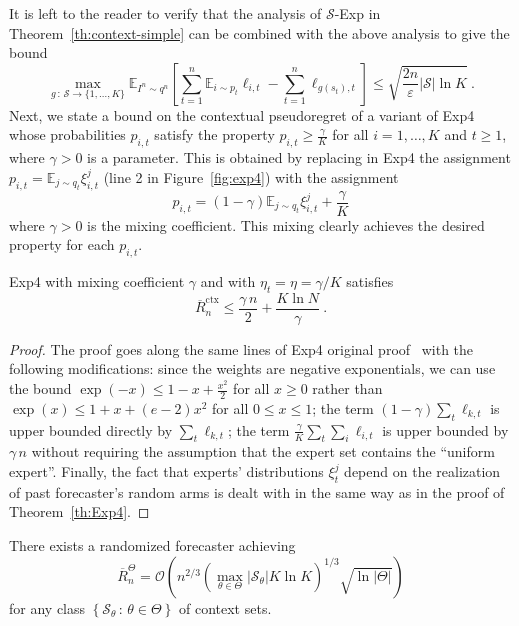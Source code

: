 \documentclass[11pt]{hackednow}
\newcommand{\E}{\mathbb{E}}
\newcommand{\cS}{\mathcal{S}}
\newcommand{\oR}{\overline{R}}
\newcommand{\theset}[2]{\left\{{#1}\,:\,{#2}\right\}}
\newcommand{\ve}{\varepsilon}
\newcommand{\oRx}{\oR^{\mathrm{ctx}}}
\begin{document}
It is left to the reader to verify that the analysis of $\cS$-Exp in Theorem~\ref{th:context-simple} can be combined with the above analysis to give the bound
\begin{equation}
\label{eq:exp3-rebel-cont}
    \max_{g \,:\, \cS\to\{1,\dots,K\}} \E_{I^n \sim q^n} \left[ \sum_{t=1}^n \E_{i \sim p_t} \ell_{i,t} - \sum_{t=1}^n \ell_{g(s_t),t} \right] \le
    \sqrt{\frac{2 n}{\ve}|\cS|\ln K}~.
\end{equation}
Next, we state a bound on the contextual pseudoregret of a variant of Exp4 whose probabilities $p_{i,t}$ satisfy the property $p_{i,t} \ge \tfrac{\gamma}{K}$ for all $i=1,\dots,K$ and $t \ge 1$, where $\gamma > 0$ is a parameter. This is obtained by replacing in Exp4 the assignment $p_{i,t} = \E_{j \sim q_t} \xi_{i,t}^j$ (line 2 in Figure~\ref{fig:exp4}) with the assignment
\[
	p_{i,t} = (1-\gamma)\E_{j \sim q_t} \xi_{i,t}^j + \frac{\gamma}{K}
\]
where $\gamma > 0$ is the mixing coefficient. This mixing clearly achieves the desired property for each $p_{i,t}$.
\begin{theorem}
\label{th:exp4-mixing}
Exp4 with mixing coefficient $\gamma$ and with $\eta_t = \eta = \gamma/K$ satisfies
\begin{equation}
\label{eq:exp4bound-mix}
	\oRx_n \le \frac{\gamma\,n}{2} + \frac{K\ln N}{\gamma}~.
\end{equation}
\end{theorem}
\begin{proof}
The proof goes along the same lines of Exp4 original proof~\cite[Theorem~7.1]{ACFS03} with the following modifications: since the weights are negative exponentials, we can use the bound $\exp(-x) \le 1 - x + \tfrac{x^2}{2}$ for all $x \ge 0$ rather than $\exp(x) \le 1 + x + (e-2)x^2$ for all $0 \le x \le 1$; the term $(1-\gamma)\sum_t\ell_{k,t}$ is upper bounded directly by $\sum_t\ell_{k,t}$; the term $\tfrac{\gamma}{K}\sum_t\sum_i \ell_{i,t}$ is upper bounded by $\gamma\,n$ without requiring the assumption that the expert set contains the ``uniform expert''. Finally, the fact that experts' distributions $\xi_t^j$ depend on the realization of past forecaster's random arms is dealt with in the same way as in the proof of Theorem~\ref{th:Exp4}.
\end{proof}
\begin{theorem}
\label{th:theta-regret}
There exists a randomized forecaster achieving
\[
	\oR^{\Theta}_n = \mathcal{O}\left(n^{2/3}\left(\max_{\theta\in\Theta}|\cS_{\theta}|K\ln K\right)^{1/3}\sqrt{\ln|\Theta|}\right)
\]
for any class $\theset{\cS_{\theta}}{\theta\in\Theta}$ of context sets.
\end{theorem}
\end{document}

